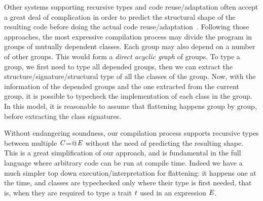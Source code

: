 Other systems supporting recursive types and code reuse/adaptation often accept a great deal of
complication in order to predict the structural shape of the resulting code before doing the actual
code reuse/adaptation~\cite{deepfjig,traitsFerr,packageTempl,MetaML}.
Following those approaches, 
the most expressive compilation process may divide the program in groups of mutually 
dependent classes.
Each group may also depend on a number of other groups.
This would form a \emph{direct acyclic graph} of groups.
To type a group, we first need to type all depended groups, then
we can extract the structure/signature/structural type of all
the classes of the group.
Now, with the information of the depended groups and the one extracted
from the current group, it is possible to typecheck the implementation
 of each class in the group.
In this model, it is reasonable to assume that flattening happens group by group, before
extracting the class signatures.


Without endangering soundness, our compilation process supports recursive types between multiple $\mathit{C}$\Q@=@$\mathit{E}$ without
the need of predicting the resulting shape. This is a great simplification of our approach,
and is fundamental in the full language where arbitrary code can be run at compile time.
Indeed we have a much simpler top down execution/interpretation for flattening:
it happens one at the time, and classes are typechecked only where their type is first needed,
that is, when they are required to type a trait $\mathit{t}$ used in an expression $\mathit{E}$.

